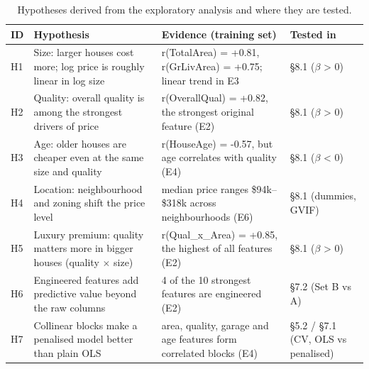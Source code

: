 \begin{table}[t]
\centering
\small
\begin{tabular}{llll}
\toprule
ID & Hypothesis & Evidence (training set) & Tested in \\
\midrule
H1 & Size: larger houses cost more; log price is roughly linear in log size & r(TotalArea) = +0.81, r(GrLivArea) = +0.75; linear trend in E3 & §8.1 ($\beta$ > 0) \\
H2 & Quality: overall quality is among the strongest drivers of price & r(OverallQual) = +0.82, the strongest original feature (E2) & §8.1 ($\beta$ > 0) \\
H3 & Age: older houses are cheaper even at the same size and quality & r(HouseAge) = -0.57, but age correlates with quality (E4) & §8.1 ($\beta$ < 0) \\
H4 & Location: neighbourhood and zoning shift the price level & median price ranges \$94k–\$318k across neighbourhoods (E6) & §8.1 (dummies, GVIF) \\
H5 & Luxury premium: quality matters more in bigger houses (quality $\times$ size) & r(Qual\_x\_Area) = +0.85, the highest of all features (E2) & §8.1 ($\beta$ > 0) \\
H6 & Engineered features add predictive value beyond the raw columns & 4 of the 10 strongest features are engineered (E2) & §7.2 (Set B vs A) \\
H7 & Collinear blocks make a penalised model better than plain OLS & area, quality, garage and age features form correlated blocks (E4) & §5.2 / §7.1 (CV, OLS vs penalised) \\
\bottomrule
\end{tabular}
\caption{Hypotheses derived from the exploratory analysis and where they are tested.}
\label{tab:hypotheses}
\end{table}
